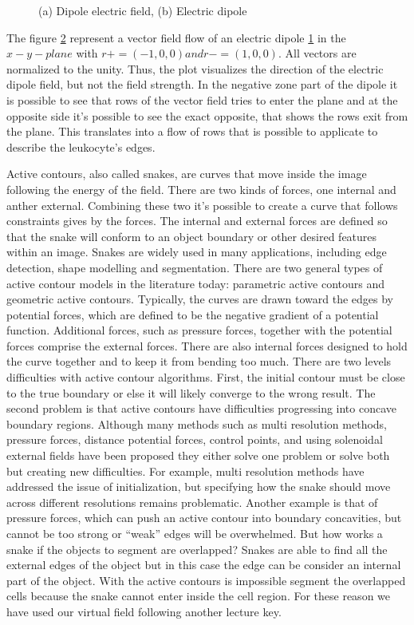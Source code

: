\begin{figure}
\begin{subfigure}[b]{0.5\textwidth}
		\caption{ }
		\label{fig:dipole}
	\end{subfigure}
	\caption{(a) Dipole electric field, (b) Electric dipole}
	\label{fig:fielddipole}
\end{figure}
The figure \ref{fig:fielddipole} represent a vector field flow of an electric dipole \ref{fig:dipole} in the $x-y-plane$ with $r+=(-1,0,0) and r-=(1,0,0)$. All vectors are normalized to the unity. Thus, the plot visualizes the direction of the electric dipole field, but not the field strength. In the negative zone part of the dipole it is possible to see that rows of the vector field tries to enter the plane and at the opposite side it’s possible to see the exact opposite, that shows the rows exit from the plane. This translates into a flow of rows that is possible to applicate to describe the leukocyte's edges.

Active contours, also called snakes, are curves that move inside the image following the energy of the field. There are two kinds of forces, one internal and anther external. Combining these two it's possible to create a curve that follows constraints gives by the forces. The  internal  and  external  forces  are  defined  so  that  the  snake  will conform to an object boundary or other desired features within an image. Snakes are widely used  in  many  applications,  including  edge  detection,  shape  modelling and segmentation. There  are  two  general  types  of  active  contour  models  in  the literature  today:  parametric active contours and geometric active contours. Typically,  the  curves  are  drawn  toward  the edges  by  potential  forces,  which  are  defined  to  be  the  negative  gradient  of  a  potential function.  Additional  forces,  such  as  pressure  forces,  together  with  the  potential  forces comprise the external forces. There are also internal forces designed to hold the curve together and to keep it from bending too  much.  There  are  two  levels  difficulties  with  active  contour  algorithms.  First,  the  initial contour must be close to the true boundary or else it will likely converge to the wrong result. The second problem is that active contours have difficulties progressing into concave  boundary  regions.  Although  many  methods  such  as  multi resolution  methods, pressure forces, distance potential forces, control points, and using solenoidal external fields have been proposed they either solve one problem or solve both but creating new difficulties. For  example,  multi resolution  methods  have  addressed  the  issue  of  initialization,  but specifying  how  the  snake  should  move  across  different  resolutions  remains  problematic. Another example is that of pressure forces, which can push an active contour into boundary concavities, but cannot be too strong or “weak” edges will be overwhelmed. But how works a snake if the objects to segment are overlapped? Snakes are able to find all the external edges of the object but in this case the edge can be consider an internal part of the object. With the active contours is impossible segment the overlapped cells because the snake cannot enter inside the cell region. For these reason we have used our virtual field following another lecture key.

